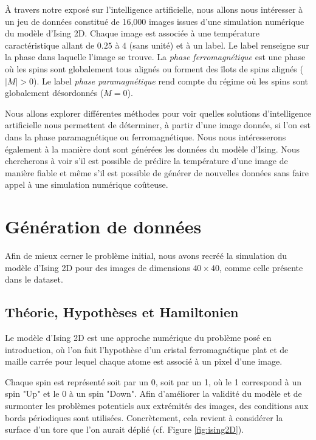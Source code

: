 \documentclass[11pt, parskip=half]{scrartcl} %
\begin{document}
À travers notre exposé sur l'intelligence artificielle, nous allons nous intéresser à un jeu de données constitué de 16,000 images issues d'une simulation numérique du modèle d'Ising 2D. Chaque image est associée à une température caractéristique allant de $0.25$ à $4$ (sans unité) et à un label. Le label renseigne sur la phase dans laquelle l'image se trouve. La \textit{phase ferromagnétique} est une phase où les spins sont globalement tous alignés ou forment des îlots de spins alignés ($|M| > 0$). Le label \textit{phase paramagnétique} rend compte du régime où les spins sont globalement désordonnés ($M = 0$).

Nous allons explorer différentes méthodes pour voir quelles solutions d'intelligence artificielle nous permettent de déterminer, à partir d'une image donnée, si l'on est dans la phase paramagnétique ou ferromagnétique. Nous nous intéresserons également à la manière dont sont générées les données du modèle d'Ising. Nous chercherons à voir s'il est possible de prédire la température d'une image de manière fiable et même s'il est possible de générer de nouvelles données sans faire appel à une simulation numérique coûteuse.

\newpage
\section{Génération de données}

Afin de mieux cerner le problème initial, nous avons recréé la simulation du modèle d'Ising 2D pour des images de dimensions $40 \times 40$, comme celle présente dans le dataset.

\subsection{Théorie, Hypothèses et Hamiltonien}
Le modèle d'Ising 2D est une approche numérique du problème posé en introduction, où l'on fait l'hypothèse d'un cristal ferromagnétique plat et de maille carrée pour lequel chaque atome est associé à un pixel d'une image.

Chaque spin est représenté soit par un 0, soit par un 1, où le 1 correspond à un spin "Up" et le 0 à un spin "Down". Afin d'améliorer la validité du modèle et de surmonter les problèmes potentiels aux extrémités des images, des conditions aux bords périodiques sont utilisées. Concrètement, cela revient à considérer la surface d'un tore que l'on aurait déplié (cf. Figure \ref{fig:ising2D}).
\end{document}

